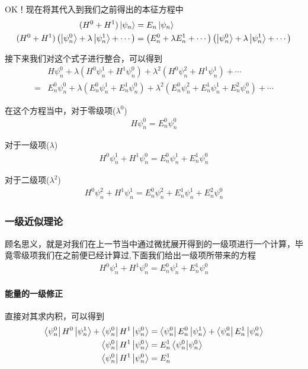 \documentclass{article}
\begin{document}
OK！现在将其代入到我们之前得出的本征方程中
\begin{align*}
    (H^0+H^1)\ket{\psi_n}&=E_n\ket{\psi_n}\\
    (H^0+H^1)\left(\ket{\psi_n^0}+\lambda\ket{\psi_n^1}+\cdots\right)&=\left(E_n^0+\lambda E_n^1+\cdots\right)\left(\ket{\psi_n^0}+\lambda\ket{\psi_n^1}+\cdots\right)
\end{align*}

接下来我们对这个式子进行整合，可以得到
\begin{align*}
    &H\psi_n^0+\lambda\left(H^0\psi_n^1+H^1\psi_n^0\right)+\lambda^2\left(H^0\psi_n^2+H^1\psi_n^1\right)+\cdots\\
    =&E_n^0\psi_n^0+\lambda\left(E_n^0\psi_n^1+E_n^1\psi_n^0\right)+\lambda^2\left(E_n^0\psi_n^2+E_n^1\psi_n^1+E_n^2\psi_n^0\right)+\cdots
\end{align*}

在这个方程当中，对于零级项($\lambda^0$)
\begin{align*}
    H\psi_n^0=E_n^0\psi_n^0
\end{align*}

对于一级项($\lambda$)
\begin{align*}
    H^0\psi_n^1+H^1\psi_n^0=E_n^0\psi_n^1+E_n^1\psi_n^0
\end{align*}

对于二级项($\lambda^2$)
\begin{align*}
    H^0\psi_n^2+H^1\psi_n^1=E_n^0\psi_n^2+E_n^1\psi_n^1+E_n^2\psi_n^0
\end{align*}

\subsubsection{一级近似理论}
顾名思义，就是对我们在上一节当中通过微扰展开得到的一级项进行一个计算，毕竟零级项我们在之前便已经计算过,下面我们给出一级项所带来的方程
\begin{align*}
    H^0\psi_n^1+H^1\psi_n^0=E_n^0\psi_n^1+E_n^1\psi_n^0
\end{align*}

\paragraph{能量的一级修正}直接对其求内积，可以得到
\begin{align*}
    \bra{\psi_n^0}H^0\ket{\psi_n^1}+\bra{\psi_n^0}H^1\ket{\psi_n^0}&=\bra{\psi_n^0}E_n^0\ket{\psi_n^1}+\bra{\psi_n^0}E_n^1\ket{\psi_n^0}\\
    \bra{\psi_n^0}H^1\ket{\psi_n^0}&=E_n^1\braket{\psi_n^0}{\psi_n^0}\\
    \bra{\psi_n^0}H^1\ket{\psi_n^0}&=E_n^1
\end{align*}
\end{document}
